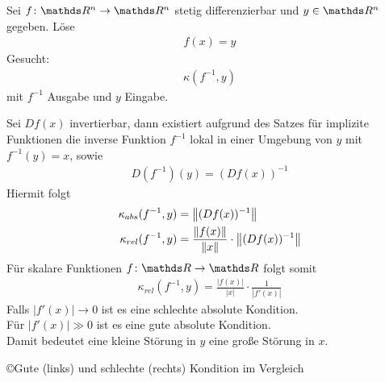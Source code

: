 \begin{Bspe}
  Sei $f\colon \Ren\rightarrow\Ren$ stetig differenzierbar und $y\in\Ren$ gegeben. Löse
  \begin{gather*}
    f(x) = y
  \end{gather*}
  Gesucht:
  \begin{gather*}
    \kappa(f^{-1},y)
  \end{gather*}
  mit $f^{-1}$ Ausgabe und $y$ Eingabe.

  Sei $Df(x)$ invertierbar, dann existiert aufgrund des Satzes für implizite Funktionen die inverse Funktion $f^{-1}$ lokal in einer Umgebung von $y$ mit $f^{-1}(y)=x$, sowie
  \begin{gather*}
    D(f^{-1})(y) = (Df(x))^{-1}
  \end{gather*}
  Hiermit folgt
  \begin{align}
    \nonumber
    \kappa_{abs}(f^{-1},y) &= \left\| (Df(x))^{-1} \right\| \\
    \kappa_{rel}(f^{-1},y) &= \frac{\left\| f(x) \right\|}{\left\| x \right\|}\cdot\left\| (Df(x))^{-1} \right\|  \label{III.2.15}
  \end{align}
  Für skalare Funktionen $f\colon \R\rightarrow\R$ folgt somit
  \begin{gather*}
    \kappa_{rel}(f^{-1},y) = \frac{|f(x)|}{|x|}\cdot \frac{1}{|f'(x)|}
  \end{gather*}
  Falls $|f'(x)|\longrightarrow 0$ ist es eine schlechte absolute Kondition. \\
  Für $|f'(x)| \gg 0$ ist es eine gute absolute Kondition.\\
  Damit bedeutet eine kleine Störung in $y$ eine große Störung in $x$.\\
  \begin{image}{\copyright Gute (links) und schlechte (rechts) Kondition im Vergleich}
\end{image}
\end{Bspe}
